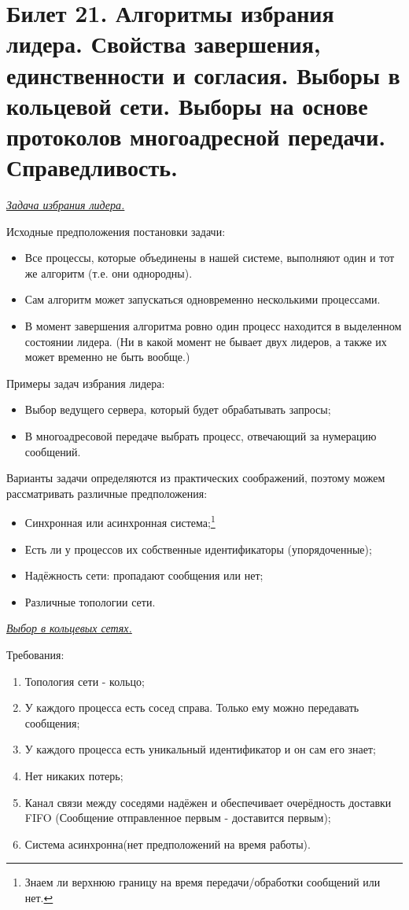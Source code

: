 \newpage
\section{Билет 21. Алгоритмы избрания лидера. Свойства завершения, единственности и согласия. Выборы в кольцевой сети. Выборы на основе протоколов многоадресной передачи. Справедливость.}\label{b21}
\begin{center}
    \textit{\underline{Задача избрания лидера.}}
\end{center}
Исходные предположения постановки задачи:
\begin{itemize}
\item Все процессы, которые объединены в нашей системе, выполняют один и тот же алгоритм (т.е. они однородны).
\item Сам алгоритм может запускаться одновременно несколькими процессами.
\item В момент завершения алгоритма ровно один процесс находится в выделенном состоянии лидера. (Ни в какой момент не бывает двух лидеров, а также их может временно не быть вообще.)
\end{itemize}
Примеры задач избрания лидера: 
\begin{itemize}
\item Выбор ведущего сервера, который будет обрабатывать запросы;
\item В многоадресовой передаче выбрать процесс, отвечающий за нумерацию сообщений.
\end{itemize}
Варианты задачи определяются из практических соображений, поэтому можем рассматривать различные предположения:
\begin{itemize}
\item Синхронная или асинхронная система;\footnote{Знаем ли верхнюю границу на время передачи/обработки сообщений или нет.}
\item Есть ли у процессов их собственные идентификаторы (упорядоченные);
\item Надёжность сети: пропадают сообщения или нет;
\item Различные топологии сети.
\end{itemize}
\begin{center}
    \textit{\underline{Выбор в кольцевых сетях.}}
\end{center}
Требования:
\begin{enumerate}
\item Топология сети - кольцо;
\item У каждого процесса есть сосед справа. Только ему можно передавать сообщения;
\item У каждого процесса есть уникальный идентификатор и он сам его знает;
\item Нет никаких потерь;
\item Канал связи между соседями надёжен и обеспечивает очерёдность доставки FIFO (Сообщение отправленное первым - доставится первым);
\item Система асинхронна(нет предположений на время работы).
\end{enumerate}

